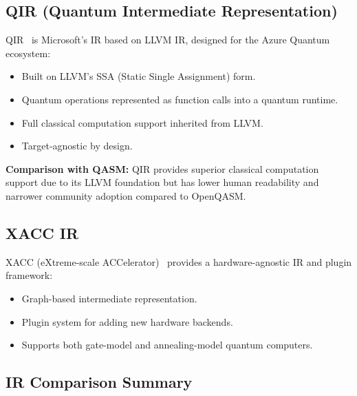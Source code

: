 \documentclass[journal]{IEEEtran}
\begin{document}
\subsection{QIR (Quantum Intermediate Representation)}

QIR~\cite{qir2021} is Microsoft's IR based on LLVM IR, designed for the Azure Quantum ecosystem:
\begin{itemize}
    \item Built on LLVM's SSA (Static Single Assignment) form.
    \item Quantum operations represented as function calls into a quantum runtime.
    \item Full classical computation support inherited from LLVM.
    \item Target-agnostic by design.
\end{itemize}

\textbf{Comparison with QASM:} QIR provides superior classical computation support due to its LLVM foundation but has lower human readability and narrower community adoption compared to OpenQASM.

\subsection{XACC IR}

XACC (eXtreme-scale ACCelerator)~\cite{mccaskey2020xacc} provides a hardware-agnostic IR and plugin framework:
\begin{itemize}
    \item Graph-based intermediate representation.
    \item Plugin system for adding new hardware backends.
    \item Supports both gate-model and annealing-model quantum computers.
\end{itemize}

\subsection{IR Comparison Summary}
\end{document}
